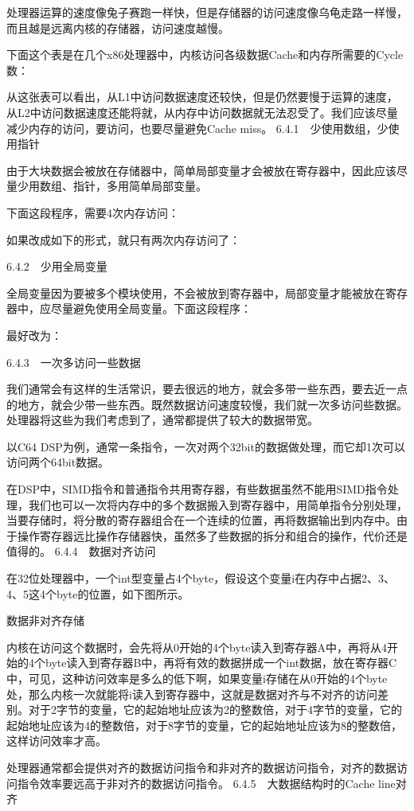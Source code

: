 \documentclass[12pt,UTF8]{ctexbook}
\begin{document}
处理器运算的速度像兔子赛跑一样快，但是存储器的访问速度像乌龟走路一样慢，而且越是远离内核的存储器，访问速度越慢。

下面这个表是在几个x86处理器中，内核访问各级数据Cache和内存所需要的Cycle数：

从这张表可以看出，从L1中访问数据速度还较快，但是仍然要慢于运算的速度，从L2中访问数据速度还能将就，从内存中访问数据就无法忍受了。我们应该尽量减少内存的访问，要访问，也要尽量避免Cache miss。
6.4.1　少使用数组，少使用指针

由于大块数据会被放在存储器中，简单局部变量才会被放在寄存器中，因此应该尽量少用数组、指针，多用简单局部变量。

下面这段程序，需要4次内存访问：

如果改成如下的形式，就只有两次内存访问了：

6.4.2　少用全局变量

全局变量因为要被多个模块使用，不会被放到寄存器中，局部变量才能被放在寄存器中，应尽量避免使用全局变量。下面这段程序：

最好改为：

6.4.3　一次多访问一些数据

我们通常会有这样的生活常识，要去很远的地方，就会多带一些东西，要去近一点的地方，就会少带一些东西。既然数据访问速度较慢，我们就一次多访问些数据。处理器将这些为我们考虑到了，通常都提供了较大的数据带宽。

以C64 DSP为例，通常一条指令，一次对两个32bit的数据做处理，而它却1次可以访问两个64bit数据。

在DSP中，SIMD指令和普通指令共用寄存器，有些数据虽然不能用SIMD指令处理，我们也可以一次将内存中的多个数据搬入到寄存器中，用简单指令分别处理，当要存储时，将分散的寄存器组合在一个连续的位置，再将数据输出到内存中。由于操作寄存器远比操作存储器快，虽然多了些数据的拆分和组合的操作，代价还是值得的。
6.4.4　数据对齐访问

在32位处理器中，一个int型变量占4个byte，假设这个变量i在内存中占据2、3、4、5这4个byte的位置，如下图所示。

数据非对齐存储

内核在访问这个数据时，会先将从0开始的4个byte读入到寄存器A中，再将从4开始的4个byte读入到寄存器B中，再将有效的数据拼成一个int数据，放在寄存器C中，可见，这种访问效率是多么的低下啊，如果变量i存储在从0开始的4个byte处，那么内核一次就能将i读入到寄存器中，这就是数据对齐与不对齐的访问差别。对于2字节的变量，它的起始地址应该为2的整数倍，对于4字节的变量，它的起始地址应该为4的整数倍，对于8字节的变量，它的起始地址应该为8的整数倍，这样访问效率才高。

处理器通常都会提供对齐的数据访问指令和非对齐的数据访问指令，对齐的数据访问指令效率要远高于非对齐的数据访问指令。
6.4.5　大数据结构时的Cache line对齐
\end{document}
